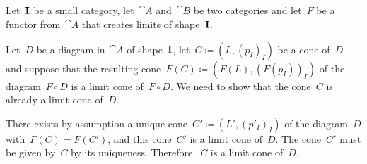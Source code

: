 \subsection{}

Let~$\mathbf{I}$ be a small category, let~$\cat{A}$ and~$\cat{B}$ be two categories and let~$F$ be a functor from~$\cat{A}$ that creates limits of shape~$\mathbf{I}$.

Let~$D$ be a diagram in~$\cat{A}$ of shape~$\mathbf{I}$, let~$C ≔ (L, (p_I)_I)$ be a cone of~$D$ and suppose that the resulting cone~$F(C) ≔ (F(L), (F(p_I))_I)$ of the diagram~$F ∘ D$ is a limit cone of~$F ∘ D$.
We need to show that the cone~$C$ is already a limit cone of~$D$.

There exists by assumption a unique cone~$C' ≔ (L', (p'_I)_I)$ of the diagram~$D$ with~$F(C) = F(C')$, and this cone~$C'$ is a limit cone of~$D$.
The cone~$C'$ must be given by~$C$ by its uniqueness.
Therefore,~$C$ is a limit cone of~$D$.
